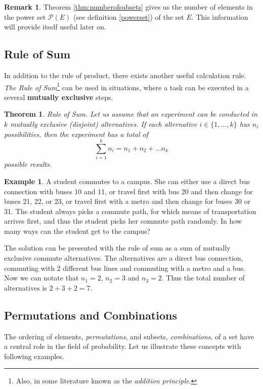 \documentclass[12pt,a4paper,leqno]{report}
\theoremstyle{plain}
\newtheorem{lause}[equation]{Theorem}
\theoremstyle{definition}
\newtheorem{esim}[equation]{Example}
\newtheorem{remark}[equation]{Remark}
\begin{document}
\begin{remark}
Theorem \ref{thm:numberofsubsets} gives us the number of elements in the power set $\mathcal{P}(E)$ (see definition \ref{powerset}) of the set $E$. This information will provide itself useful later on.
\end{remark}

\subsection{Rule of Sum}

In addition to the rule of product, there exists another useful calculation rule. \emph{The Rule of Sum}\footnote{Also, in some literature known as the \emph{addition principle}.} can be used in situations, where a task can be executed in a several \textbf{mutually exclusive} steps.

\begin{lause}\label{ruleofsum} Rule of Sum.  Let us assume that an experiment can be conducted in $k$ mutually exclusive (disjoint) alternatives. If each alternative $i \in \{1, \dots ,k\}$ has $n_i$ possibilities, then the experiment has a total of 
\[
\sum_{i=1}^k n_i = n_1 + n_2 + \dots n_k
\]
possible results.
\end{lause}

\begin{esim}
A student commutes to a campus. She can either use a direct bus connection with buses 10 and 11, or travel first with bus 20 and then change for buses 21, 22, or 23, or travel first with a metro and then change for buses 30 or 31. The student always picks a commute path, for which means of transportation arrives first, and thus the student picks her commute path randomly. In how many ways can the student get to the campus?

The solution can be presented with the rule of sum as a sum of mutually exclusive commute alternatives. The alternatives are a direct bus connection, commuting with 2 different bus lines and commuting with a metro and a bus. Now we can notate that $n_1 = 2$, $n_2 = 3$ and $n_3 = 2$. Thus the total number of alternatives is $2+3+2 = 7$.
\end{esim}

\subsection{Permutations and Combinations}

The ordering of elements, \emph{permutations}, and subsets, \emph{combinations}, of a set have a central role in the field of probability. Let us illustrate these concepts with following examples.
\end{document}

